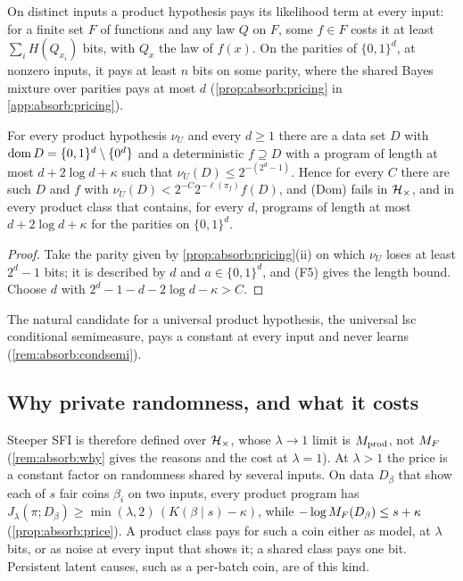 On distinct inputs a product hypothesis pays its likelihood term at every input: for a finite set $F$ of functions and any law $Q$ on $F$, some $f\in F$ costs it at least $\sum_iH(Q_{x_i})$ bits, with $Q_x$ the law of $f(x)$. On the parities of $\{0,1\}^d$, at nonzero inputs, it pays at least $n$ bits on some parity, where the shared Bayes mixture over parities pays at most $d$ (\cref{prop:absorb:pricing} in \cref{app:absorb:pricing}).

\begin{corollary}\label{cor:absorb:nouniversal}
For every product hypothesis $\nu_U$ and every $d\ge1$ there are a data set $D$ with $\operatorname{dom} D=\{0,1\}^d\setminus\{0^d\}$ and a deterministic $f\supseteq D$ with a program of length at most $d+2\log d+\kappa$ such that $\nu_U(D)\le2^{-(2^d-1)}$. Hence for every $C$ there are such $D$ and $f$ with $\nu_U(D)<2^{-C}2^{-\ell(\pi_f)}f(D)$, and (Dom) fails in $\mathcal{H}_{\times}$, and in every product class that contains, for every $d$, programs of length at most $d+2\log d+\kappa$ for the parities on $\{0,1\}^d$.
\end{corollary}

\begin{proof}
Take the parity given by \cref{prop:absorb:pricing}(ii) on which $\nu_U$ loses at least $2^d-1$ bits; it is described by $d$ and $a\in\{0,1\}^d$, and (F5) gives the length bound. Choose $d$ with $2^d-1-d-2\log d-\kappa>C$.
\end{proof}

The natural candidate for a universal product hypothesis, the universal lsc conditional semimeasure, pays a constant at every input and never learns (\cref{rem:absorb:condsemi}).

\subsection{Why private randomness, and what it costs}\label{sec:absorb:price}

Steeper SFI is therefore defined over $\mathcal{H}_{\times}$, whose $\lambda\to1$ limit is $M_{\mathrm{prod}}$, not $M_{F}$ (\cref{rem:absorb:why} gives the reasons and the cost at $\lambda=1$). At $\lambda>1$ the price is a constant factor on randomness shared by several inputs. On data $D_\beta$ that show each of $s$ fair coins $\beta_i$ on two inputs, every product program has $J_\lambda(\pi;D_\beta)\ge\min(\lambda,2)\,(K(\beta\mid s)-\kappa)$, while $-\log M_{F}(D_\beta)\le s+\kappa$ (\cref{prop:absorb:price}). A product class pays for such a coin either as model, at $\lambda$ bits, or as noise at every input that shows it; a shared class pays one bit. Persistent latent causes, such as a per-batch coin, are of this kind.


